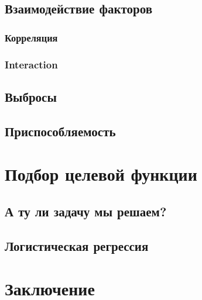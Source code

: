 \documentclass[14pt, fleqn, xcolor={dvipsnames, table}, hyperref={unicode}, babel={english,russian}, inputenc=utf8x]{beamer}
\begin{document}
\subsection{Взаимодействие факторов}
\subsubsection{Корреляция}
\subsubsection{Interaction}
\subsection{Выбросы}
\subsection{Приспособляемость}
\section{Подбор целевой функции}
\subsection{А ту ли задачу мы решаем?}
\subsection{Логистическая регрессия}
\section{Заключение}

\end{document}

